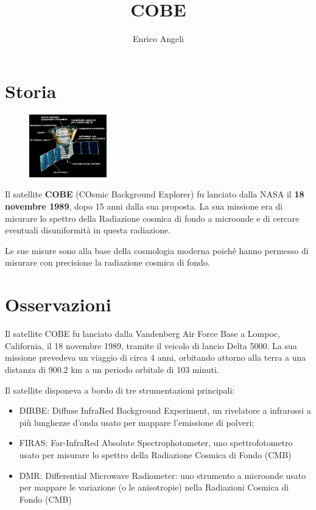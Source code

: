 \documentclass[12pt,a4paper]{article}
\begin{document}
\title{\vspace{-70pt}COBE}
\author{Enrico Angeli}
\date{}
\maketitle
\pagestyle{empty}
\thispagestyle{empty}


\section*{Storia}
\label{storia}
\begin{figure}
  \vspace{-10pt}
  \begin{center}
    \includegraphics[width=0.30\textwidth]{satellite}
  \end{center}
  \vspace{-20pt}
\end{figure}
Il satellite \textbf{COBE} (COsmic Background Explorer) fu lanciato dalla NASA il \textbf{18 novembre 1989}, dopo 15 anni dalla sua proposta. La sua missione era di misurare lo spettro della Radiazione cosmica di fondo a microonde e di cercare eventuali disuniformità in questa radiazione.

Le sue misure sono alla base della cosmologia moderna poiché hanno permesso di misurare con precisione la radiazione cosmica di fondo.

\section*{Osservazioni}
\label{osservazioni}

Il satellite COBE fu lanciato dalla Vandenberg Air Force Base a Lompoc, California, il 18 novembre 1989, tramite il veicolo di lancio Delta 5000.
La sua missione prevedeva un viaggio di circa 4 anni, orbitando attorno alla terra a una distanza di 900.2 km a un periodo orbitale di 103 minuti. 

Il satellite disponeva a bordo di tre strumentazioni principali:

\begin{itemize}
\item DIRBE: Diffuse InfraRed Background Experiment, un rivelatore a infrarossi a più lunghezze d'onda usato per mappare l'emissione di polveri;

\item FIRAS: Far-InfraRed Absolute Spectrophotometer, uno spettrofotometro usato per misurare lo spettro della Radiazione Cosmica di Fondo (CMB)

\item DMR: Differential Microwave Radiometer: uno strumento a microonde usato per mappare le variazione (o le anisotropie) nella Radiazioni Cosmica di Fondo (CMB)

\end{itemize}
\end{document}
